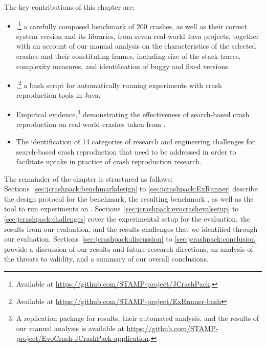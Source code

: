 The key contributions of this chapter are:
\begin{itemize}
\item \crashpack,\footnote{Available at \url{https://github.com/STAMP-project/JCrashPack}.} a carefully composed benchmark of 200 crashes, as well as their correct system version and its libraries, from seven real-world Java projects, together with an account of our manual analysis on the characteristics of the selected crashes and their constituting frames, including size of the stack traces, complexity measures, and identification of buggy and fixed versions.

\item \exrunner,\footnote{Available at \url{https://github.com/STAMP-project/ExRunner-bash}} a bash script for automatically running experiments with crash reproduction tools in Java.

\item Empirical evidence,\footnote{A replication package for \evocrash results, their automated analysis, and the results of our manual analysis is available at \url{https://github.com/STAMP-project/EvoCrash-JCrashPack-application}.} demonstrating the effectiveness of search-based crash reproduction on real world crashes taken from \crashpack.

\item The identification of 14 categories of research and engineering challenges for search-based crash reproduction that need to be addressed in order to facilitate uptake in practice of crash reproduction research.

\end{itemize}

The remainder of the chapter is structured as follows:
Sections~\ref{sec:jcrashpack:benchmarkdesign} to \ref{sec:jcrashpack:ExRunner} describe the design protocol for the benchmark, the resulting benchmark \crashpack, as well as the \exrunner tool to run experiments on \crashpack.
Sections~\ref{sec:jcrashpack:evocrashevalsetup} to \ref{sec:jcrashpack:challenges} cover the experimental setup for the \evocrash evaluation, the results from our evaluation, and the results challenges that we identified through our evaluation.
Sections~\ref{sec:jcrashpack:discussion} to \ref{sec:jcrashpack:conclusion} provide a discussion of our results and future research directions, an analysis of the threats to validity, and a summary of our overall conclusions.

